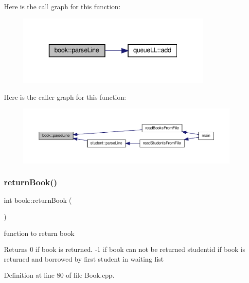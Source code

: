 Here is the call graph for this function\+:
\nopagebreak
\begin{figure}[H]
\begin{center}
\leavevmode
\includegraphics[width=277pt]{classbook_acf51be6cb1a1e98d461144e134583c8f_cgraph}
\end{center}
\end{figure}
Here is the caller graph for this function\+:
\nopagebreak
\begin{figure}[H]
\begin{center}
\leavevmode
\includegraphics[width=350pt]{classbook_acf51be6cb1a1e98d461144e134583c8f_icgraph}
\end{center}
\end{figure}
\mbox{\label{classbook_af11d02d9964b788986dc8e26d1cdf373}} 
\subsubsection{\texorpdfstring{return\+Book()}{returnBook()}}
{\footnotesize\ttfamily int book\+::return\+Book (\begin{DoxyParamCaption}{ }\end{DoxyParamCaption})}

function to return book \begin{DoxyReturn}{Returns}
0 if book is returned. -\/1 if book can not be returned studentid if book is returned and borrowed by first student in waiting list 
\end{DoxyReturn}


Definition at line 80 of file Book.\+cpp.


